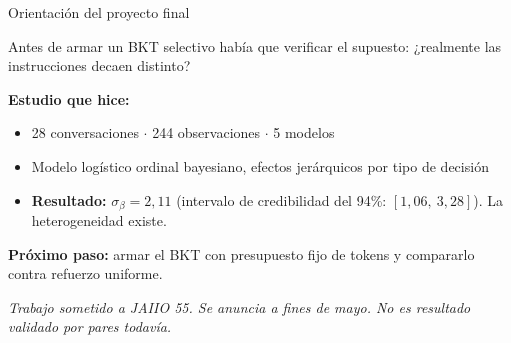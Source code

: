 \documentclass[aspectratio=169, 11pt]{beamer}
\begin{document}
\begin{frame}{Orientaci\'on del proyecto final}

Antes de armar un BKT selectivo hab\'ia que verificar el supuesto: ¿realmente las instrucciones decaen distinto?

\vspace{0.8em}

\textbf{Estudio que hice:}
\begin{itemize}
    \item 28 conversaciones $\cdot$ 244 observaciones $\cdot$ 5 modelos
    \item Modelo log\'istico ordinal bayesiano, efectos jer\'arquicos por tipo de decisi\'on
    \item \textbf{Resultado:} $\sigma_\beta = 2{,}11$ (intervalo de credibilidad del 94\%: $[1{,}06,\ 3{,}28]$). La heterogeneidad existe.
\end{itemize}

\vspace{0.6em}

\textbf{Pr\'oximo paso:} armar el BKT con presupuesto fijo de tokens y compararlo contra refuerzo uniforme.

\vspace{0.8em}

\footnotesize\itshape
Trabajo sometido a JAIIO 55. Se anuncia a fines de mayo. No es resultado validado por pares todav\'ia.

\end{frame}

\appendix
\end{document}
